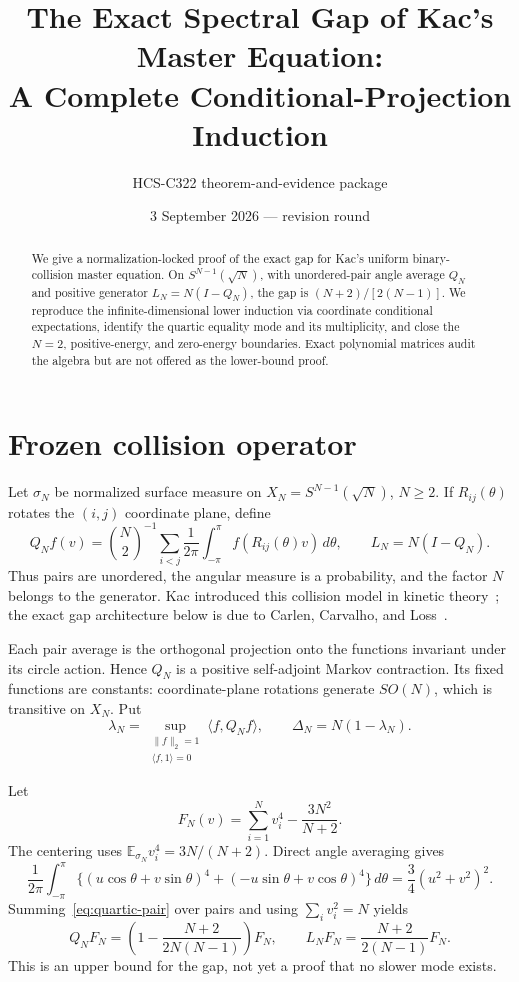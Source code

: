 \documentclass[9pt]{extarticle}
\title{The Exact Spectral Gap of Kac's Master Equation:\\A Complete Conditional-Projection Induction}
\author{HCS-C322 theorem-and-evidence package}
\date{3 September 2026 --- revision round \CRevisionRound}
\newcommand{\E}{\mathbb E}
\newcommand{\ip}[2]{\langle #1,#2\rangle}
\begin{document}
\maketitle
\begin{abstract}
We give a normalization-locked proof of the exact gap for Kac's uniform
binary-collision master equation.  On $S^{N-1}(\sqrt N)$, with unordered-pair
angle average $Q_N$ and positive generator $L_N=N(I-Q_N)$, the gap is
$(N+2)/[2(N-1)]$.  We reproduce the infinite-dimensional lower induction via
coordinate conditional expectations, identify the quartic equality mode and
its multiplicity, and close the $N=2$, positive-energy, and zero-energy
boundaries.  Exact polynomial matrices audit the algebra but are not offered
as the lower-bound proof.
\end{abstract}

\section{Frozen collision operator}
Let $\sigma_N$ be normalized surface measure on
$X_N=S^{N-1}(\sqrt N)$, $N\geq2$.  If $R_{ij}(\theta)$ rotates the
$(i,j)$ coordinate plane, define
\begin{equation}\label{eq:Q}
 Q_Nf(v)=\binom N2^{-1}\sum_{i<j}\frac1{2\pi}
 \int_{-\pi}^{\pi}f(R_{ij}(\theta)v)\,d\theta,
 \qquad L_N=N(I-Q_N).
\end{equation}
Thus pairs are unordered, the angular measure is a probability, and the
factor $N$ belongs to the generator.  Kac introduced this collision model
in kinetic theory~\cite{kac}; the exact gap architecture below is due to
Carlen, Carvalho, and Loss~\cite{ccl}.

Each pair average is the orthogonal projection onto the functions invariant
under its circle action.  Hence $Q_N$ is a positive self-adjoint Markov
contraction.  Its fixed functions are constants: coordinate-plane rotations
generate $SO(N)$, which is transitive on $X_N$.  Put
\[
 \lambda_N=\sup_{\substack{\|f\|_2=1\\\ip f1=0}}\ip f{Q_Nf},
 \qquad \Delta_N=N(1-\lambda_N).
\]

Let
\[
 F_N(v)=\sum_{i=1}^Nv_i^4-\frac{3N^2}{N+2}.
\]
The centering uses $\E_{\sigma_N}v_i^4=3N/(N+2)$.  Direct angle averaging
gives
\begin{equation}\label{eq:quartic-pair}
 \frac1{2\pi}\int_{-\pi}^{\pi}
 \{(u\cos\theta+v\sin\theta)^4+(-u\sin\theta+v\cos\theta)^4\}\,d\theta
 =\frac34(u^2+v^2)^2.
\end{equation}
Summing~\eqref{eq:quartic-pair} over pairs and using $\sum_i v_i^2=N$
yields
\begin{equation}\label{eq:quartic-eigen}
 Q_NF_N=\left(1-\frac{N+2}{2N(N-1)}\right)F_N,
 \qquad L_NF_N=\frac{N+2}{2(N-1)}F_N.
\end{equation}
This is an upper bound for the gap, not yet a proof that no slower mode exists.
\end{document}
